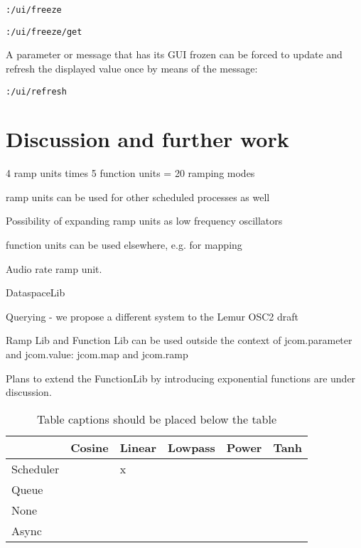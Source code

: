 \documentclass{article}
\begin{document}
\texttt{:/ui/freeze}

\texttt{:/ui/freeze/get}

A parameter or message that has its GUI frozen can be forced to update and refresh the displayed value once by means of the message:

\texttt{:/ui/refresh}




\section{Discussion and further work} %
\label{sec:discussion_and_further_work}

4 ramp units times 5 function units = 20 ramping modes

ramp units can be used for other scheduled processes as well

Possibility of expanding ramp units as low frequency oscillators

function units can be used elsewhere, e.g. for mapping

Audio rate ramp unit.

DataspaceLib

Querying - we propose a different system to the Lemur OSC2 draft

Ramp Lib and Function Lib can be used outside the context of jcom.parameter and jcom.value: jcom.map and jcom.ramp


Plans to extend the FunctionLib by introducing exponential functions are under discussion. %

\cite{Momeni:2003}



\begin{table}
\begin{center}
\begin{tabular}{|l|l|l|l|l|l|}
\hline
          & Cosine & Linear & Lowpass & Power & Tanh \\
\hline
Scheduler &        &   x    &         &       & \\
\hline
Queue	  &        &        &         &       & \\
\hline
None	  &        &        &         &       & \\
\hline
Async	  &        &        &         &       & \\
\hline
\end{tabular}
\end{center}
\caption{Table captions should be placed below the table}
\label{tab:example} %
\end{table}
\end{document}
